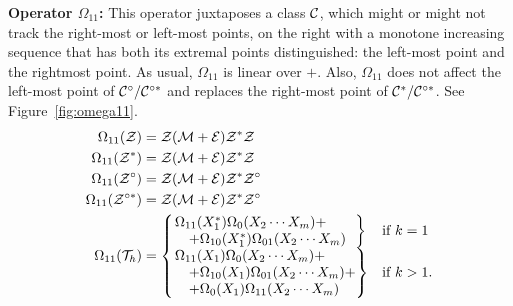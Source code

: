 \documentclass[12pt, a4paper, twoside]{report}
\begin{document}
\noindent\textbf{Operator $\Omega_{11}$:}
This operator juxtaposes a class $\mathcal{C}$, which might or might not track the right-most or left-most points, on the right with a monotone increasing sequence that has both its extremal points distinguished: the left-most point and the rightmost point. As usual, $\Omega_{11}$ is linear over $+$. Also, $\Omega_{11}$ does not affect the left-most point of $\mathcal{C}^\circ/\mathcal{C}^{\circ*}$ and replaces the right-most point of $\mathcal{C}^*/\mathcal{C}^{\circ*}$. See Figure~\ref{fig:omega11}.
\begin{align}
  \begin{aligned}
  \Omega_{11}(\Z) &= \Z(\M+\EE)\Z^*\Z\\
  \Omega_{11}(\Z^*) &= \Z(\M+\EE)\Z^*\Z\\
  \Omega_{11}(\Z^\circ) &= \Z(\M+\EE)\Z^*\Z^\circ\\
  \Omega_{11}(\Z^{\circ*}) &= \Z(\M+\EE)\Z^*\Z^\circ\\
  \Omega_{11}(\T_h) &=
  \begin{cases}
    \begin{rcases}
      \Omega_{11}(X_1^*)\Omega_0(X_2\cdots X_m)+\ \ \ \\
      \quad+\Omega_{10}(X_1^*)\Omega_{01}(X_2\cdots X_m)\ \ 
    \end{rcases} &\text{if $k = 1$}\\
    \begin{rcases}
      \Omega_{11}(X_1)\Omega_0(X_2\cdots X_m) +\\
      \quad+\Omega_{10}(X_1)\Omega_{01}(X_2\cdots X_m) +\\
      \quad+\Omega_0(X_1)\Omega_{11}(X_2\cdots X_m)
    \end{rcases} &\text{if $k>1$.}
  \end{cases}
\end{aligned}
                   \label{eq:iterjuxt_def_omega11}
\end{align}
\end{document}
